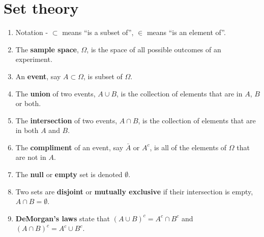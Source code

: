 \documentclass[12pt]{article}
\begin{document}

\newpage

\section{Set theory}
\begin{enumerate}[1.]
\item Notation - $\subset$ means ``is a subset of'', $\in$ means ``is an element of''.
\item The {\bf sample space}, $\Omega$, is the space of all possible outcomes of an experiment.
\item An {\bf event}, say $A \subset \Omega$, is  subset of $\Omega$.
\item The {\bf union} of two events, $A \cup B$, is the collection of elements that are in $A$, $B$ or both.
\item The {\bf intersection} of two events, $A \cap B$,  is the collection of elements that are in both $A$ and $B$.
\item The {\bf compliment} of an event, say $\bar A$ or $A^c$, is all of the elements of $\Omega$ that are not in $A$.
\item The {\bf null} or {\bf empty} set is denoted $\emptyset$.
\item Two sets are {\bf disjoint} or {\bf mutually exclusive} 
  if their intersection is empty, $A\cap B = \emptyset$.
\item {\bf DeMorgan's laws} state that $(A\cup B)^c = A^c \cap B^c$ and
  $(A\cap B)^c = A^c \cup B^c$.
\end{enumerate}
\end{document}
